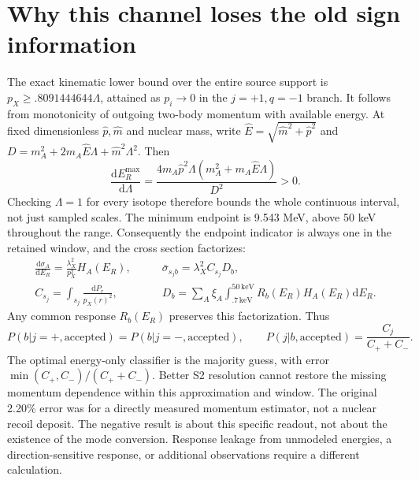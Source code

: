 \documentclass[11pt,a4paper]{article}
\newcommand{\dd}{\mathrm d}
\begin{document}
\section{Why this channel loses the old sign information}
The exact kinematic lower bound over the entire source support is
$p_X\geq .8091444644\Lambda$, attained as $p_i\to0$ in the
$j=+1,q=-1$ branch. It follows from monotonicity of outgoing two-body
momentum with available energy. At fixed dimensionless $\hat p,\hat m$
and nuclear mass, write $\hat E=\sqrt{\hat m^2+\hat p^2}$ and
$D=m_A^2+2m_A\hat E\Lambda+\hat m^2\Lambda^2$. Then
\begin{equation}
 \frac{\dd E_R^{\max}}{\dd\Lambda}
 =\frac{4m_A\hat p^2\Lambda(m_A^2+m_A\hat E\Lambda)}{D^2}>0.
\end{equation}
Checking $\Lambda=1$ for every isotope therefore bounds the whole
continuous interval, not just sampled scales. The minimum endpoint
is 9.543 MeV, above 50 keV throughout the range.
Consequently the endpoint indicator is always one in the retained
window, and the cross section factorizes:
\begin{align}
 \frac{\dd\sigma_A}{\dd E_R}=
 \frac{\lambda_X^2}{p_X^2}H_A(E_R),&\qquad
 \bar\sigma_{s_jb}=\lambda_X^2 C_{s_j}D_b,\\
 C_{s_j}=\int_{s_j}\frac{\dd P_r}{p_X(r)^2},&\qquad
 D_b=\sum_A\xi_A\int_{.7\,\mathrm{keV}}^{50\,\mathrm{keV}}
 R_b(E_R)H_A(E_R)\dd E_R.
\end{align}
Any common response $R_b(E_R)$ preserves this factorization. Thus
\begin{equation}
 P(b|j=+,\mathrm{accepted})=P(b|j=-,\mathrm{accepted}),\qquad
 P(j|b,\mathrm{accepted})=\frac{C_j}{C_++C_-}.
\end{equation}
The optimal energy-only classifier is the majority guess, with error
$\min(C_+,C_-)/(C_++C_-)$. Better S2 resolution cannot restore the
missing momentum dependence within this approximation and window.
The original 2.20\% error was for a directly measured momentum
estimator, not a nuclear recoil deposit. The negative result is about
this specific readout, not about the existence of the mode conversion.
Response leakage from unmodeled energies, a direction-sensitive response,
or additional observations require a different calculation.
\end{document}
